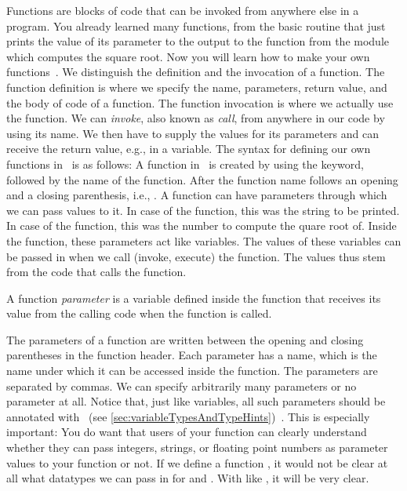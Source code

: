 %
%
Functions are blocks of code that can be invoked from anywhere else in a program.
You already learned many functions, from the basic  routine that just prints the value of its parameter to the output to the  function from the  module which computes the square root.
Now you will learn how to make your own functions~\cite{PSF:P3D:TPT:MCFT}.%
%
%
\label{sec:definingFunctions}%
%
We distinguish the definition and the invocation of a function.
The function definition is where we specify the name, parameters, return value, and the body of code of a function.
The function invocation is where we actually use the function.
We can \emph{invoke}, also known as \emph{call}, from anywhere in our code by using its name.
We then have to supply the values for its parameters and can receive the return value, e.g., in a variable.
%
The syntax for defining our own functions in \python\ is as follows:%
%
%
%
A function in \python\ is created by using the  keyword, followed by the name of the function.%
%
%
%
After the function name follows an opening and a closing parenthesis, i.e., \pythonIdx{(\idxdots)}.
A function can have parameters through which we can pass values to it.
In case of the  function, this was the string to be printed.
In case of the  function, this was the number to compute the quare root of.
Inside the function, these parameters act like variables.
The values of these variables can be passed in when we call (invoke, execute) the function.
The values thus stem from the code that calls the function.%
%
\begin{definition}[Parameter]%
A function \emph{parameter} is a variable defined inside the function that receives its value from the calling code when the function is called.%
\end{definition}%
%
The parameters of a function are written between the opening and closing parentheses in the function header.
Each parameter has a name, which is the name under which it can be accessed inside the function.
The parameters are separated by commas.
We can specify arbitrarily many parameters or no parameter at all.
Notice that, just like variables, all such parameters should be annotated with ~(see \cref{sec:variableTypesAndTypeHints})~\cite{PEP3107}.
This is especially important:
You do want that users of your function can clearly understand whether they can pass integers, strings, or floating point numbers as parameter values to your function or not.
If we define a function , it would not be clear at all what datatypes we can pass in for  and .
With  like , it will be very clear.

